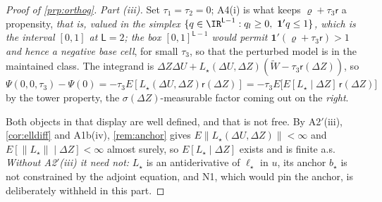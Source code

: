 \begin{proof}[Proof of \cref{prp:orthog}]
\emph{Part (iii).}
Set $\tau_1=\tau_2=0$; A4(i) is what keeps $\varrho+\tau_3\mathsf r$ a propensity, \emph{that is,
valued in the simplex $\{q\in\IR^{\mathsf L-1}:q_l\ge0,\ \mathbf 1'q\le1\}$, which is the interval
$[0,1]$ at $\mathsf L=2$; the box $[0,1]^{\mathsf L-1}$ would permit $\mathbf 1'(\varrho+\tau_3\mathsf r)>1$
and hence a negative base cell}, for small $\tau_3$, so that the perturbed model is in the maintained
class. The integrand is
$\Delta Z\Delta U+L_\star(\Delta U,\Delta Z)(\widetilde W-\tau_3\mathsf r(\Delta Z))$, so
$\Psi(0,0,\tau_3)-\Psi(0)=-\tau_3E[L_\star(\Delta U,\Delta Z)\mathsf r(\Delta Z)]
=-\tau_3E\big[E[L_\star\mid\Delta Z]\,\mathsf r(\Delta Z)\big]$ by the tower property, the
$\sigma(\Delta Z)$-measurable factor coming out on the \emph{right}.

Both objects in that display are well defined, and that is not free. By A2$'$(iii),
\cref{cor:elldiff} and A1b(iv), \cref{rem:anchor} gives $E\|L_\star(\Delta U,\Delta Z)\|<\infty$ and
$E[\|L_\star\|\mid\Delta Z]<\infty$ almost surely, so $E[L_\star\mid\Delta Z]$ exists and is finite a.s.
\emph{Without A2$'$(iii) it need not:} $L_\star$ is an antiderivative of $\ell_\star$ in $u$, its anchor
$b_\star$ is not constrained by the adjoint equation, and N1, which would pin the anchor, is
deliberately withheld in this part.


\end{proof}
